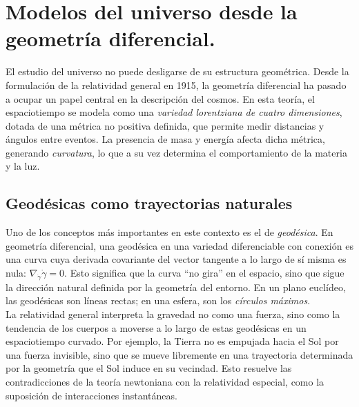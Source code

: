 \documentclass{aleph-revista}
\begin{document}
\section{Modelos del universo desde la geometría diferencial.}
El estudio del universo no puede desligarse de su estructura geométrica. Desde la formulación de la relatividad general en 1915, la geometría diferencial ha pasado a ocupar un papel central en la descripción del cosmos. En esta teoría, el espaciotiempo se modela como una \textit{variedad lorentziana de cuatro dimensiones}, dotada de una métrica no positiva definida, que permite medir distancias y ángulos entre eventos. La presencia de masa y energía afecta dicha métrica, generando \textit{curvatura}, lo que a su vez determina el comportamiento de la materia y la luz.
\subsection*{Geodésicas como trayectorias naturales}
Uno de los conceptos más importantes en este contexto es el de \textit{geodésica}. En geometría diferencial, una geodésica en una variedad diferenciable con conexión es una curva cuya derivada covariante del vector tangente a lo largo de sí misma es nula: $\nabla_{\dot{\gamma}} \dot{\gamma} = 0$. Esto significa que la curva “no gira” en el espacio, sino que sigue la dirección natural definida por la geometría del entorno. En un plano euclídeo, las geodésicas son líneas rectas; en una esfera, son los \textit{círculos máximos}.\\
La relatividad general interpreta la gravedad no como una fuerza, sino como la tendencia de los cuerpos a moverse a lo largo de estas geodésicas en un espaciotiempo curvado. Por ejemplo, la Tierra no es empujada hacia el Sol por una fuerza invisible, sino que se mueve libremente en una trayectoria determinada por la geometría que el Sol induce en su vecindad. Esto resuelve las contradicciones de la teoría newtoniana con la relatividad especial, como la suposición de interacciones instantáneas.
\end{document}
